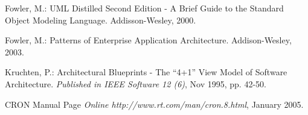 \begin{thebibliography}{99}

 Fowler, M.: UML Distilled Second Edition - A Brief Guide to the Standard Object Modeling Language.
Addisson-Wesley, 2000.

 Fowler, M.: Patterns of Enterprise Application Architecture. Addison-Wesley, 2003.

 Kruchten, P.: Architectural Blueprints - The ``4+1'' View Model of Software Architecture.
\textit{Published in IEEE Software 12 (6)}, Nov 1995, pp. 42-50.

 CRON Manual Page
\textit{Online http://www.rt.com/man/cron.8.html}, January 2005.

\end{thebibliography}